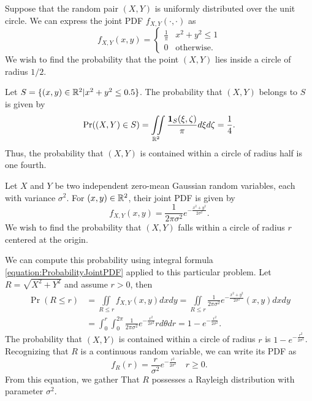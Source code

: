 \begin{example}
Suppose that the random pair $(X, Y)$ is uniformly distributed over the unit circle.
We can express the joint PDF $f_{X,Y} (\cdot, \cdot)$ as
\begin{equation*}
f_{X,Y} (x, y) = \begin{cases} \frac{1}{\pi} & x^2 + y^2 \leq 1 \\
0 & \text{otherwise} . \end{cases}
\end{equation*}
We wish to find the probability that the point $(X, Y)$ lies inside a circle of radius $1/2$.

Let $S = \{ (x, y) \in \mathbb{R}^2 | x^2 + y^2 \leq 0.5 \}$.
The probability that $(X, Y)$ belongs to $S$ is given by
\begin{equation*}
\Pr ((X,Y) \in S)
= \iint\limits_{\mathbb{R}^2}
\frac{ \mathbf{1}_{S}(\xi, \zeta) }{\pi} d\xi d\zeta
= \frac{1}{4} .
\end{equation*}
Thus, the probability that $(X,Y)$ is contained within a circle of radius half is one fourth.
\end{example}

\begin{example}
Let $X$ and $Y$ be two independent zero-mean Gaussian random variables, each with variance $\sigma^2$.
For $(x, y) \in \mathbb{R}^2$, their joint PDF is given by
\begin{equation*}
f_{X,Y} (x,y) = \frac{1}{2 \pi \sigma^2} e^{- \frac{ x^2 + y^2 }{2 \sigma^2} } .
\end{equation*}
We wish to find the probability that $(X,Y)$ falls within a circle of radius $r$ centered at the origin.

We can compute this probability using integral formula \eqref{equation:ProbabilityJointPDF} applied to this particular problem.
Let $R = \sqrt{X^2 + Y^2}$ and assume $r > 0$, then
\begin{equation*}
\begin{split}
\Pr (R \leq r) &= \iint\limits_{R \leq r} f_{X,Y} (x,y) dx dy
= \iint\limits_{R \leq r} \frac{1}{2 \pi \sigma^2}
e^{- \frac{ x^2 + y^2 }{2 \sigma^2} } (x,y) dx dy \\
&= \int_0^r \int_0^{2\pi} \frac{1}{2 \pi \sigma^2}
e^{- \frac{ r^2 }{2 \sigma^2} } r d\theta dr
= 1 - e^{- \frac{ r^2 }{2 \sigma^2} } .
\end{split}
\end{equation*}
The probability that $(X, Y)$ is contained within a circle of radius $r$ is $1 - e^{- \frac{ r^2 }{2 \sigma^2} }$.
Recognizing that $R$ is a continuous random variable, we can write its PDF as
\begin{equation*}
f_R (r) = \frac{r}{\sigma^2} e^{- \frac{r^2}{2 \sigma^2} } \quad r \geq 0 .
\end{equation*}
From this equation, we gather That $R$ possesses a Rayleigh distribution with parameter $\sigma^2$.
\end{example}


